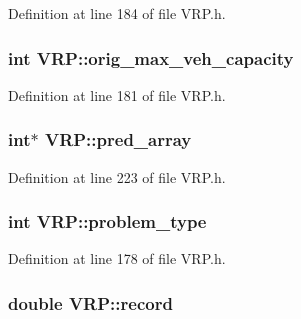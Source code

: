 Definition at line 184 of file VRP.h.

\hypertarget{class_v_r_p_a23ee0d0e34908651c27f2710d08b182d}{
\subsubsection[{orig\_\-max\_\-veh\_\-capacity}]{\setlength{\rightskip}{0pt plus 5cm}int {\bf VRP::orig\_\-max\_\-veh\_\-capacity}}}
\label{class_v_r_p_a23ee0d0e34908651c27f2710d08b182d}


Definition at line 181 of file VRP.h.

\hypertarget{class_v_r_p_a171c6f136ff0334141eba4f8df239f3a}{
\subsubsection[{pred\_\-array}]{\setlength{\rightskip}{0pt plus 5cm}int$\ast$ {\bf VRP::pred\_\-array}}}
\label{class_v_r_p_a171c6f136ff0334141eba4f8df239f3a}


Definition at line 223 of file VRP.h.

\hypertarget{class_v_r_p_aa6eca2d600d3493057af43499619abf4}{
\subsubsection[{problem\_\-type}]{\setlength{\rightskip}{0pt plus 5cm}int {\bf VRP::problem\_\-type}}}
\label{class_v_r_p_aa6eca2d600d3493057af43499619abf4}


Definition at line 178 of file VRP.h.

\hypertarget{class_v_r_p_a0561674f364aba302b1cc4d0f76f6837}{
\subsubsection[{record}]{\setlength{\rightskip}{0pt plus 5cm}double {\bf VRP::record}}}
\label{class_v_r_p_a0561674f364aba302b1cc4d0f76f6837}


